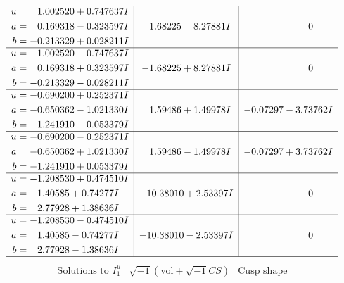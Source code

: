 \documentclass[1p]{elsarticle_modified}
\theoremstyle{definition}
\newcommand{\I}{\sqrt{-1}}
\begin{document}
$$\begin{array}{c|c|c}
\begin{aligned}
u &= \phantom{-}1.002520 + 0.747637 I \\
a &= \phantom{-}0.169318 - 0.323597 I \\
b &= -0.213329 + 0.028211 I\end{aligned}
 & -1.68225 - 8.27881 I & \phantom{-0.000000 } 0 \\ \hline\begin{aligned}
u &= \phantom{-}1.002520 - 0.747637 I \\
a &= \phantom{-}0.169318 + 0.323597 I \\
b &= -0.213329 - 0.028211 I\end{aligned}
 & -1.68225 + 8.27881 I & \phantom{-0.000000 } 0 \\ \hline\begin{aligned}
u &= -0.690200 + 0.252371 I \\
a &= -0.650362 - 1.021330 I \\
b &= -1.241910 - 0.053379 I\end{aligned}
 & \phantom{-}1.59486 + 1.49978 I & -0.07297 - 3.73762 I \\ \hline\begin{aligned}
u &= -0.690200 - 0.252371 I \\
a &= -0.650362 + 1.021330 I \\
b &= -1.241910 + 0.053379 I\end{aligned}
 & \phantom{-}1.59486 - 1.49978 I & -0.07297 + 3.73762 I \\ \hline\begin{aligned}
u &= -1.208530 + 0.474510 I \\
a &= \phantom{-}1.40585 + 0.74277 I \\
b &= \phantom{-}2.77928 + 1.38636 I\end{aligned}
 & -10.38010 + 2.53397 I & \phantom{-0.000000 } 0 \\ \hline\begin{aligned}
u &= -1.208530 - 0.474510 I \\
a &= \phantom{-}1.40585 - 0.74277 I \\
b &= \phantom{-}2.77928 - 1.38636 I\end{aligned}
 & -10.38010 - 2.53397 I & \phantom{-0.000000 } 0\\
 \hline 
 \end{array}$$\newpage$$\begin{array}{c|c|c}  
\text{Solutions to }I^u_{1}& \I (\text{vol} + \sqrt{-1}CS) & \text{Cusp shape}\\
 \hline 
\begin{aligned}

\end{aligned}
\end{array}$$
\end{document}
